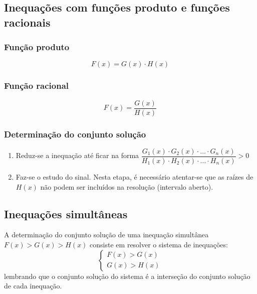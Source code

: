 \documentclass{article}
\begin{document}
\subsection{Inequações com funções produto e funções racionais}
\subsubsection{Função produto}
\begin{equation*}
    F(x)=G(x)\cdot  H(x)
\end{equation*}

\subsubsection{Função racional}
\begin{equation*}
    F(x)=\dfrac{G(x)}{H(x)}
\end{equation*}

\subsubsection{Determinação do conjunto solução}
\begin{enumerate}
    \item Reduz-se a inequação até ficar na forma $\dfrac{G_1(x)\cdot G_2(x)\cdot\ldots\cdot G_n(x)}{H_1(x)\cdot H_2(x)\cdot\ldots\cdot H_n(x)}>0$
    \item Faz-se o estudo do sinal. Nesta etapa, é necessário atentar-se que as raízes de $H(x)$ não podem ser incluídos na resolução (intervalo aberto).
\end{enumerate}

\subsection{Inequações simultâneas}
A determinação do conjunto solução de uma inequação simultânea $F(x)>G(x)>H(x)$ consiste em resolver o sistema de inequações:
\begin{equation*}
    \left\{\begin{aligned}
        F(x)>G(x)\\
        G(x)>H(x)
    \end{aligned}\right.
\end{equation*}
lembrando que o conjunto solução do sistema é a interseção do conjunto solução de cada inequação.
\end{document}

